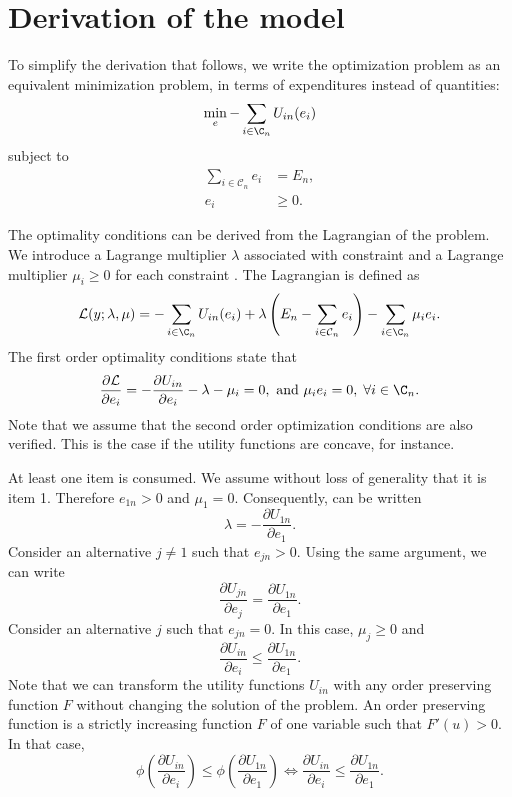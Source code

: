 \documentclass[12pt,a4paper]{article}
\renewcommand{\L}{\mathcal{L}}
\begin{document}




\appendix
\section{Derivation of the model}
\label{eq:derivation}
To simplify the derivation that follows, we write the
optimization problem as an equivalent minimization problem, in terms
of expenditures instead of quantities:
\begin{equation}
\min_{e} -\sum_{i \in \C_n} U_{in}(e_i)
\end{equation}
subject to
\begin{align}
  \sum_{i \in \mathcal{C}_n} e_i &= E_n, \label{eq:budget_constraint}\\
 e_{i} &\geq 0. \label{eq:non_negativity}
\end{align}

The optimality conditions can be derived from the Lagrangian of the problem. We introduce a Lagrange multiplier $\lambda$ associated with constraint  and a Lagrange multiplier $\mu_i \geq 0$ for each constraint . The Lagrangian is defined as
\begin{equation}
  \L(y;\lambda, \mu) = -\sum_{i \in \C_n} U_{in}(e_i) + \lambda\left(E_n -  \sum_{i \in \mathcal{C}_n} e_{i}\right) - \sum_{i \in \C_n} \mu_i e_i.
\end{equation}
The first order optimality conditions state that
\begin{equation}
  \label{eq:optimality}
\frac{\partial \L}{\partial e_i} = - \frac{\partial U_{in}}{\partial e_i} - \lambda - \mu_i  = 0, \text{ and } \mu_i e_i = 0, \; \forall i \in \C_n.
\end{equation}
Note that we assume that the second order optimization conditions are also verified. This is the case if the utility functions are concave, for instance.

At least one item is consumed. We assume without loss of generality that it is item 1. Therefore $e_{1n} > 0$ and $\mu_1=0$. Consequently,  can be written
\[
\lambda = - \frac{\partial U_{1n}}{\partial e_1}.
\]
Consider an alternative $j\neq 1$ such that $e_{jn} > 0$. Using the same argument, we can write
\[
\frac{\partial U_{jn}}{\partial e_j} = \frac{\partial U_{1n}}{\partial e_1}.
\]
Consider an alternative $j$ such that $e_{jn} = 0$. In this case, $\mu_j \geq 0$ and
\[
\frac{\partial U_{in}}{\partial e_i}  \leq \frac{\partial U_{1n}}{\partial e_1}.
\]
Note that we can transform the utility functions $U_{in}$ with any order preserving function $F$ without changing the solution of the problem. An order preserving function is a strictly increasing function $F$ of one variable such that $F'(u) > 0$. In that case,
\[
\phi\left(\frac{\partial U_{in}}{\partial e_i}\right) \leq \phi\left(\frac{\partial U_{1n}}{\partial e_1}\right) \Longleftrightarrow
\frac{\partial U_{in}}{\partial e_i}  \leq \frac{\partial U_{1n}}{\partial e_1}.
\]
\end{document}
